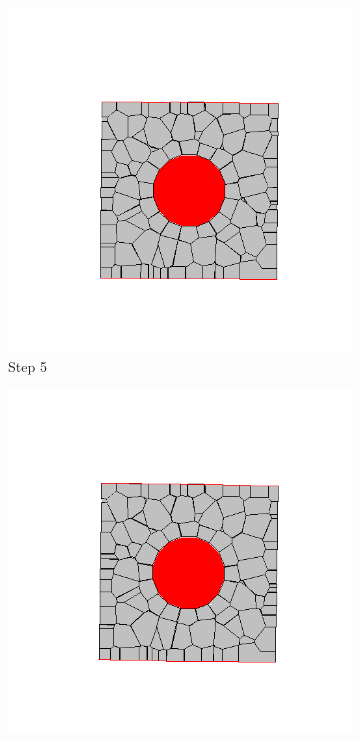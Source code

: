 \begin{figure}[ht!]
      \begin{subfigure}{.25\textwidth}
        \centering
        \includegraphics[width=1.0\linewidth]{Files/Small_ASR/CR/DEP5-STEP(005).png}
      \caption{Step 5}
      \end{subfigure}%
      \begin{subfigure}{.25\textwidth}
        \centering
        \includegraphics[width=1.0\linewidth]{Files/Small_ASR/CR/DEP5-STEP(006).png}

\end{subfigure}
\end{figure}
